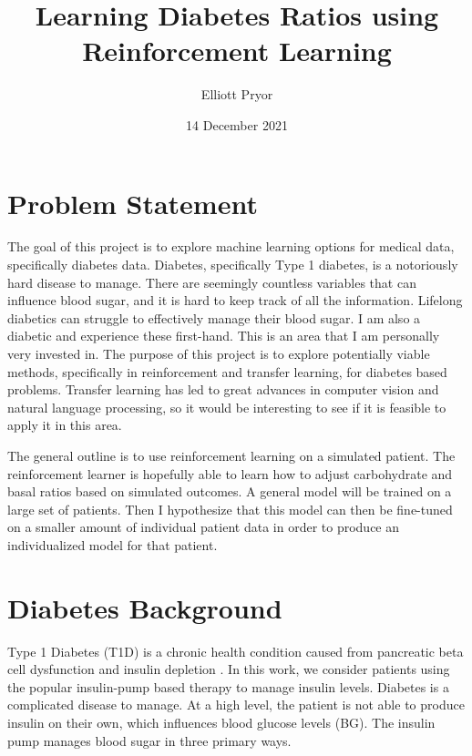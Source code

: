 \documentclass[11pt]{article}
\title{Learning Diabetes Ratios using Reinforcement Learning}
\author{Elliott Pryor}
\date{14 December 2021}
\begin{document}
\maketitle


\section{Problem Statement}
The goal of this project is to explore machine learning options for medical data, specifically diabetes data.
Diabetes, specifically Type 1 diabetes, is a notoriously hard disease to manage.
There are seemingly countless variables that can influence blood sugar, and it is hard to keep track of all the information.
Lifelong diabetics can struggle to effectively manage their blood sugar. 
I am also a diabetic and experience these first-hand. This is an area that I am personally very invested in.
The purpose of this project is to explore potentially viable methods, specifically in reinforcement and transfer learning, for diabetes based problems. 
Transfer learning has led to great advances in computer vision and natural language processing, so it would be interesting to see if it is feasible to apply it in this area. 

The general outline is to use reinforcement learning on a simulated patient.
The reinforcement learner is hopefully able to learn how to adjust carbohydrate and basal ratios based on simulated outcomes.
A general model will be trained on a large set of patients. 
Then I hypothesize that this model can then be fine-tuned on a smaller amount of individual patient data in order to produce an individualized model for that patient.

\section{Diabetes Background}
Type 1 Diabetes (T1D) is a chronic health condition caused from pancreatic beta cell dysfunction and insulin depletion \cite{tyler2020artificial}.
In this work, we consider patients using the popular insulin-pump based therapy to manage insulin levels. 
Diabetes is a complicated disease to manage. 
At a high level, the patient is not able to produce insulin on their own, which influences blood glucose levels (BG).
The insulin pump manages blood sugar in three primary ways.
\end{document}
